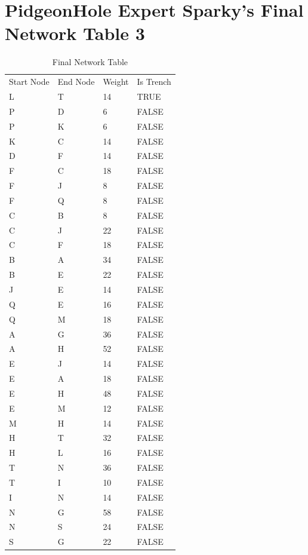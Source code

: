 \documentclass[11pt]{book}
\renewcommand{\=}[1]{\stackrel{#1}{=}} %
\theoremstyle{definition}
\theoremstyle{remark}
\begin{document}
\section{PidgeonHole Expert Sparky's Final Network Table 3}
\begin{table}[]
\begin{tabular}{llll}
Start Node & End Node & Weight & Is Trench \\
L & T & 14 & TRUE \\
P & D & 6 & FALSE \\
P & K & 6 & FALSE \\
K & C & 14 & FALSE \\
D & F & 14 & FALSE \\
F & C & 18 & FALSE \\
F & J & 8 & FALSE \\
F & Q & 8 & FALSE \\
C & B & 8 & FALSE \\
C & J & 22 & FALSE \\
C & F & 18 & FALSE \\
B & A & 34 & FALSE \\
B & E & 22 & FALSE \\
J & E & 14 & FALSE \\
Q & E & 16 & FALSE \\
Q & M & 18 & FALSE \\
A & G & 36 & FALSE \\
A & H & 52 & FALSE \\
E & J & 14 & FALSE \\
E & A & 18 & FALSE \\
E & H & 48 & FALSE \\
E & M & 12 & FALSE \\
M & H & 14 & FALSE \\
H & T & 32 & FALSE \\
H & L & 16 & FALSE \\
T & N & 36 & FALSE \\
T & I & 10 & FALSE \\
I & N & 14 & FALSE \\
N & G & 58 & FALSE \\
N & S & 24 & FALSE \\
S & G & 22 & FALSE
\end{tabular}
\caption{Final Network Table}
\label{tab:my-table}
\end{table}
\end{document}
